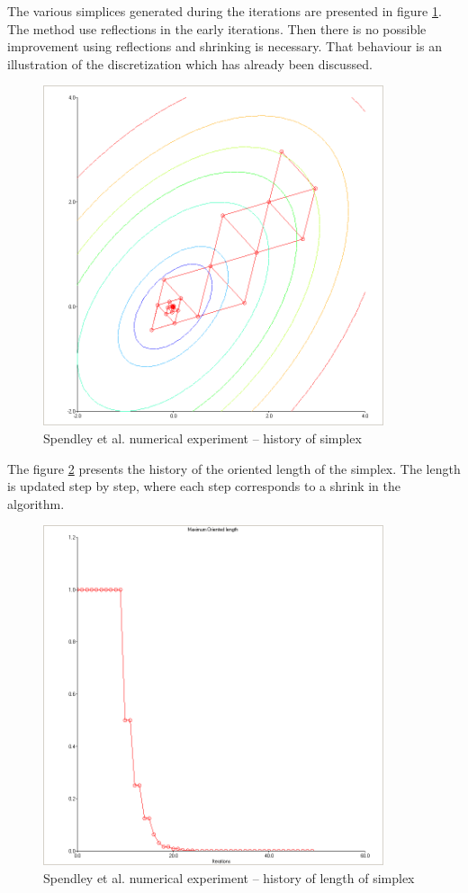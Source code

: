 The various simplices generated during the iterations are 
presented in figure \ref{fig-spendley-numexp1-historysimplex}.
The method use reflections in the early iterations. Then there
is no possible improvement using reflections and shrinking is necessary.
That behaviour is an illustration of the discretization which has already
been discussed.

\begin{figure}
\begin{center}
\includegraphics[width=10cm]{quad2bis-spendley-simplexcontours.png}
\end{center}
\caption{Spendley et al. numerical experiment -- history of simplex}
\label{fig-spendley-numexp1-historysimplex}
\end{figure}

The figure \ref{fig-spendley-numexp1-sigma} presents the history of the oriented
length of the simplex. The length is updated step by step, where each step 
corresponds to a shrink in the algorithm.

\begin{figure}
\begin{center}
\includegraphics[width=10cm]{quad2bis-spendley-history-sigma.png}
\end{center}
\caption{Spendley et al. numerical experiment -- history of length of simplex}
\label{fig-spendley-numexp1-sigma}
\end{figure}

